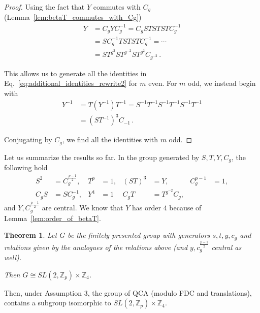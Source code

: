\documentclass[aps,twocolumn,prx,floatfix,preprintnumbers, nofootinbib,10pt]{revtex4-2}
\numberwithin{equation}{section}
\newtheorem{theorem}{Theorem}[section]
\theoremstyle{definition}
\theoremstyle{remark}
\theoremstyle{claim}
\newcommand{\Z}{{\mathbb Z}}
\begin{document}
\begin{proof}
 Using the fact that $Y$ commutes with $C_g$ (Lemma~\ref{lem:betaT_commutes_with_Cg})
 \begin{align}
  Y &= C_g Y C_g^{-1} = C_g STSTST C_g^{-1} \nonumber \\
  &= S C_g^{-1} T STST C_g^{-1} = \cdots \nonumber \\
  &= ST^{g^2} S T^{g^{-2}} S T^{g^2} C_{g^{-2}} \,.
 \end{align}

 This allows us to generate all the identities in Eq.~\eqref{eq:additional_identities_rewrite2} for $m$ even. For $m$ odd, we instead begin with
 \begin{align}
 Y^{-1} &= T (Y^{-1}) T^{-1} = S^{-1} T^{-1} S^{-1} T^{-1} S^{-1} T^{-1} \nonumber \\
 &= (ST^{-1})^3 C_{-1} \,.
 \end{align}

 Conjugating by $C_g$, we find all the identities with $m$ odd.
\end{proof}

Let us summarize the results so far. In the group generated by $S, T, Y, C_g$, the following hold
\begin{align}\label{eq:STYCg_relations}
 S^2 &= C_g^{\frac{p-1}{2}}, & T^p &= 1, & (ST)^3 &= Y, & C_g^{p-1} &= 1, \nonumber \\
 C_gS &= SC_g^{-1}, & Y^4 &= 1 & C_gT &= T^{g^{-2}} C_g ,
\end{align}
and $Y, C_g^{\frac{p-1}{2}}$ are central. We know that $Y$ has order $4$ because of Lemma~\ref{lem:order_of_betaT}.

\begin{theorem}\label{thm:SL2pZ4}
 Let $G$ be the finitely presented group with generators $s, t, y, c_g$ and relations given by the analogues of the relations above (and $y, c_g^{\frac{p-1}{2}}$ central as well).
 
 Then $G \cong SL(2, \Z_p) \times \Z_4$.
\end{theorem}

Then, under Assumption 3, the group of QCA (modulo FDC and translations), contains a subgroup isomorphic to $SL(2, \Z_p) \times \Z_4$.
\end{document}

